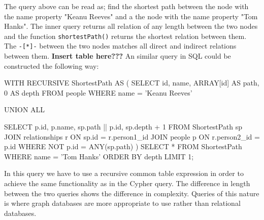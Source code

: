The query above can be read as; find the shortest path between the node with the name property "Keanu Reeves" and a the node with the name property "Tom Hanks". The inner query returns all relation of any length between the two nodes and the function \texttt{shortestPath()} returns the shortest relation between them. The \texttt{-[*]-} between the two nodes matches all direct and indirect relations between them. \textbf{Insert table here???} An similar query in SQL could be constructed the following way:
\begin{sqlCode}
WITH RECURSIVE ShortestPath AS (
  SELECT
    id,
    name,
    ARRAY[id] AS path,
    0 AS depth
  FROM
    people
  WHERE
    name = 'Keanu Reeves'

  UNION ALL

  SELECT
    p.id,
    p.name,
    sp.path || p.id,
    sp.depth + 1
  FROM
    ShortestPath sp
  JOIN
    relationships r ON sp.id = r.person1_id
  JOIN
    people p ON r.person2_id = p.id
  WHERE
    NOT p.id = ANY(sp.path) 
)
SELECT *
FROM ShortestPath
WHERE name = 'Tom Hanks'
ORDER BY depth
LIMIT 1;

\end{sqlCode}
In this query we have to use a recursive common table expression in order to achieve the same functionality as in the Cypher query. The difference in length between the two queries shows the difference in complexity. Queries of this nature is where graph databases are more appropriate to use rather than relational databases. 